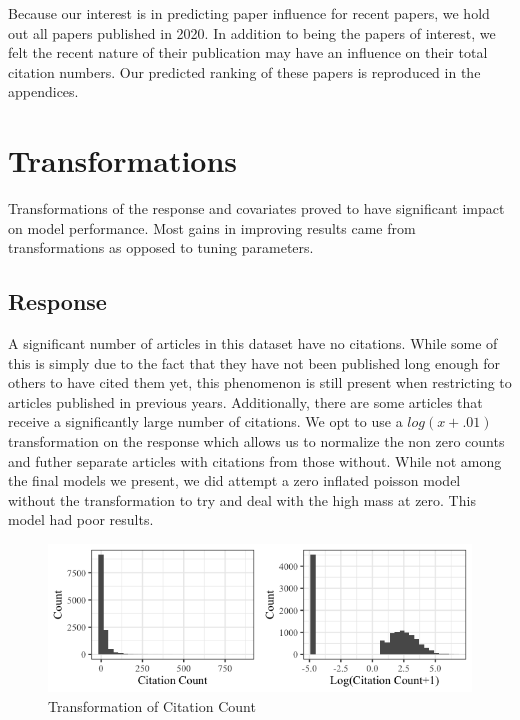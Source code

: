 \documentclass{article} %
\begin{document}
Because our interest is in predicting paper influence for recent papers, we hold out all papers published in 2020. In addition to being the papers of interest, we felt the recent nature of their publication may have an influence on their total citation numbers. Our predicted ranking of these papers is reproduced in the appendices.



\section{Transformations}

Transformations of the response and covariates proved to have significant impact on model performance. Most gains in improving results came from transformations as opposed to tuning parameters.

\subsection{Response}
A significant number of articles in this dataset have no citations. While some of this is simply due to the fact that they have not been published long enough for others to have cited them yet, this phenomenon is still present when restricting to articles published in previous years. Additionally, there are some articles that receive a significantly large number of citations. We opt to use a $log(x+.01)$ transformation on the response which allows us to normalize the non zero counts and futher separate articles with citations from those without. While not among the final models we present, we did attempt a zero inflated poisson model without the transformation to try and deal with the high mass at zero. This model had poor results.


\begin{figure}[h]
\begin{center}
\includegraphics[scale=0.5]{../Figures/citation_hist.png} 
\end{center}
\caption{Transformation of Citation Count}
\end{figure}
\end{document}
